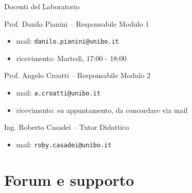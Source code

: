 \documentclass[presentation]{beamer}
\begin{document}
\begin{frame}{Docenti del Laboratorio}

\begin{block}{Prof. Danilo Pianini -- Responsabile Modulo 1}
\begin{itemize}
\item mail: \texttt{danilo.pianini@unibo.it}
\item ricevimento: Martedì, 17:00 - 18:00
\end{itemize}
\end{block}

\begin{block}{Prof. Angelo Croatti -- Responsabile Modulo 2}
\begin{itemize}
\item mail: \texttt{a.croatti@unibo.it}
\item ricevimento: su appuntamento, da concordare via mail
\end{itemize}
\end{block}

\begin{block}{Ing. Roberto Casadei -- Tutor Didattico}
\begin{itemize}
\item mail: \texttt{roby.casadei@unibo.it}
\end{itemize}
\end{block}

\end{frame}

\section{Forum e supporto}
\end{document}
